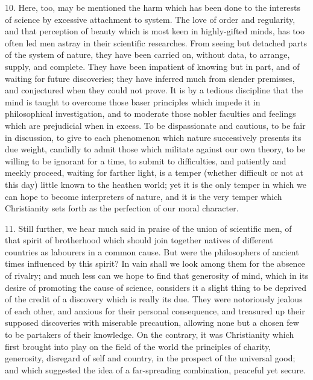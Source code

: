 10. Here, too, may be mentioned the harm which has been done to the
interests of science by excessive attachment to system. The love of
order and regularity, and that perception of beauty which is most keen
in highly-gifted minds, has too often led men astray in their
scientific researches. From seeing but detached parts of the system of
nature, they have been carried on, without data, to arrange, supply,
and complete. They have been impatient of knowing but in part, and of
waiting for future discoveries; they have inferred much from slender
premisses, and conjectured when they could not prove. It is by a
tedious discipline that the mind is taught to overcome those baser
principles which impede it in philosophical investigation, and to
moderate those nobler faculties and feelings which are prejudicial
when in excess. To be dispassionate and cautious, to be fair in
discussion, to give to each phenomenon which nature successively
presents its due weight, candidly to admit those which militate
against our own theory, to be willing to be ignorant for a time, to
submit to difficulties, and patiently and meekly proceed, waiting for
farther light, is a temper (whether difficult or not at this day)
little known to the heathen world; yet it is the only temper in which
we can hope to become interpreters of nature, and it is the very
temper which Christianity sets forth as the perfection of our moral
character.

11. Still further, we hear much said in praise of the union of
scientific men, of that spirit of brotherhood which should join
together natives of different countries as labourers in a common
cause. But were the philosophers of ancient times influenced by this
spirit? In vain shall we look among them for the absence of rivalry;
and much less can we hope to find that generosity of mind, which in
its desire of promoting the cause of science, considers it a slight
thing to be deprived of the credit of a discovery which is really its
due. They were notoriously jealous of each other, and anxious for
their personal consequence, and treasured up their supposed
discoveries with miserable precaution, allowing none but a chosen few
to be partakers of their knowledge. On the contrary, it was
Christianity which first brought into play on the field of the world
the principles of charity, generosity, disregard of self and country,
in the prospect of the universal good; and which suggested the idea of
a far-spreading combination, peaceful yet secure.

